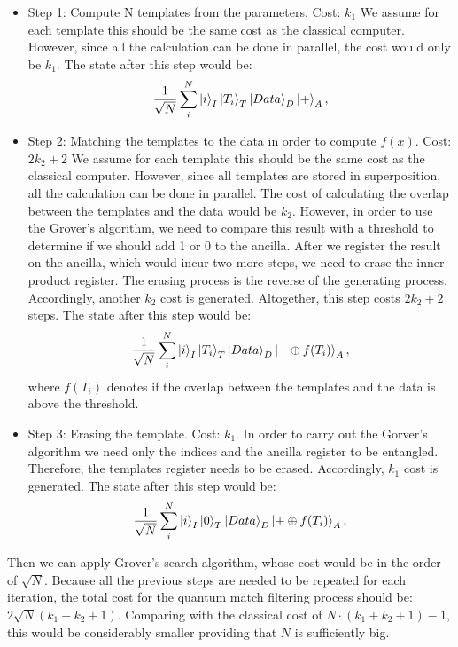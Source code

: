 \documentclass[a4paper]{jpconf}
\begin{document}
\begin{itemize}
    \item Step 1: Compute N templates from the parameters. Cost: $k_1$
    \newline We assume for each template this should be the same cost as the classical computer. However, since all the calculation can be done in parallel, the cost would only be $k_1$. The state after this step would be: 
    \begin{equation}
\label{step1}
    \frac{1}{\sqrt{N}}\sum^N_i\ket{i}_I\ket{T_i}_T\ket{Data}_D\ket{+}_A,
\end{equation}
    \item Step 2: Matching the templates to the data in order to compute $f(x)$. Cost: $2k_2+2$
    \newline We assume for each template this should be the same cost as the classical computer. However, since all templates are stored in superposition, all the calculation can be done in parallel. The cost of calculating the overlap between the templates and the data would be $k_2$. However, in order to use the Grover's algorithm, we need to compare this result with a threshold to determine if we should add 1 or 0 to the ancilla. After we register the result on the ancilla, which would incur two more steps, we need to erase the inner product register. The erasing process is the reverse of the generating process. Accordingly, another $k_2$ cost is generated. Altogether, this step costs $2k_2+2$ steps. The state after this step would be: 
    \begin{equation}
\label{step2}
    \frac{1}{\sqrt{N}}\sum^N_i\ket{i}_I\ket{T_i}_T\ket{Data}_D\ket{+\oplus f(T_i)}_A,
\end{equation}
where $f(T_i)$ denotes if the overlap between the templates and the data is above the threshold.
    \item Step 3: Erasing the template. Cost: $k_1$.
    \newline In order to carry out the Gorver's algorithm we need only the indices and the ancilla register to be entangled. Therefore, the templates register needs to be erased. Accordingly, $k_1$ cost is generated. The state after this step would be: 
    \begin{equation}
\label{step3}
    \frac{1}{\sqrt{N}}\sum^N_i\ket{i}_I\ket{0}_T\ket{Data}_D\ket{+\oplus f(T_i)}_A,
\end{equation}
\end{itemize}
Then we can apply Grover's search algorithm, whose cost would be in the order of $\sqrt{N}$. Because all the previous steps are needed to be repeated for each iteration, the total cost for the quantum match filtering process should be: $2\sqrt{N}(k_1+k_2+1)$. Comparing with the classical cost of $N \cdot (k_1+k_2+1)-1$, this would be considerably smaller providing that $N$ is sufficiently big.
\end{document}

